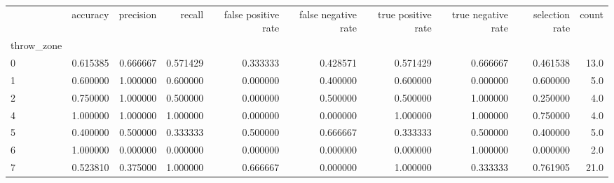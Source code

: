 \begin{tabular}{lrrrrrrrrr}
\toprule
{} &  accuracy &  precision &    recall &  false positive rate &  false negative rate &  true positive rate &  true negative rate &  selection rate &  count \\
throw\_zone &           &            &           &                      &                      &                     &                     &                 &        \\
\midrule
0          &  0.615385 &   0.666667 &  0.571429 &             0.333333 &             0.428571 &            0.571429 &            0.666667 &        0.461538 &   13.0 \\
1          &  0.600000 &   1.000000 &  0.600000 &             0.000000 &             0.400000 &            0.600000 &            0.000000 &        0.600000 &    5.0 \\
2          &  0.750000 &   1.000000 &  0.500000 &             0.000000 &             0.500000 &            0.500000 &            1.000000 &        0.250000 &    4.0 \\
4          &  1.000000 &   1.000000 &  1.000000 &             0.000000 &             0.000000 &            1.000000 &            1.000000 &        0.750000 &    4.0 \\
5          &  0.400000 &   0.500000 &  0.333333 &             0.500000 &             0.666667 &            0.333333 &            0.500000 &        0.400000 &    5.0 \\
6          &  1.000000 &   0.000000 &  0.000000 &             0.000000 &             0.000000 &            0.000000 &            1.000000 &        0.000000 &    2.0 \\
7          &  0.523810 &   0.375000 &  1.000000 &             0.666667 &             0.000000 &            1.000000 &            0.333333 &        0.761905 &   21.0 \\
\bottomrule
\end{tabular}
